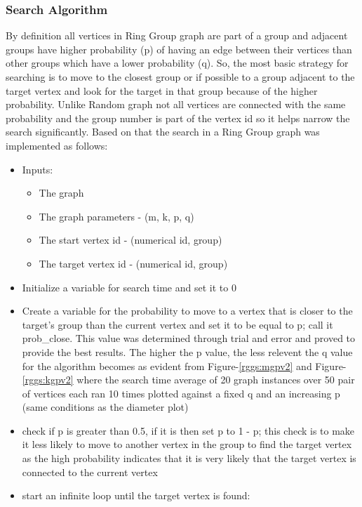 \documentclass[11pt,a4paper,notitlepage]{article}
\begin{document}
\subsubsection*{Search Algorithm}
By definition all vertices in Ring Group graph are part of a group and adjacent groups have higher probability (p) of having an edge between their vertices than other groups which have a lower probability (q). So, the most basic strategy for searching is to move to the closest group or if possible to a group adjacent to the target vertex and look for the target in that group because of the higher probability. Unlike Random graph not all vertices are connected with the same probability and the group number is part of the vertex id so it helps narrow the search significantly. Based on that the search in a Ring Group graph was implemented as follows:
\begin{itemize}
    \item Inputs:
    \begin{itemize}
        \item The graph
        \item The graph parameters - (m, k, p, q)
        \item The start vertex id - (numerical id, group)
        \item The target vertex id - (numerical id, group)
    \end{itemize}
    \item Initialize a variable for search time and set it to 0
    \item Create a variable for the probability to move to a vertex that is closer to the target's group than the current vertex and set it to be equal to p; call it prob\_close. This value was determined through trial and error and proved to provide the best results. The higher the p value, the less relevent the q value for the algorithm becomes as evident from Figure-\ref{rggs:mgpv2} and Figure-\ref{rggs:kgpv2} where the search time average of 20 graph instances over 50 pair of vertices each ran 10 times plotted against a fixed q and an increasing p (same conditions as the diameter plot)
    \item check if p is greater than 0.5, if it is then set p to 1 - p; this check is to make it less likely to move to another vertex in the group to find the target vertex as the high probability indicates that it is very likely that the target vertex is connected to the current vertex
    \item start an infinite loop until the target vertex is found:

\end{itemize}
\end{document}

